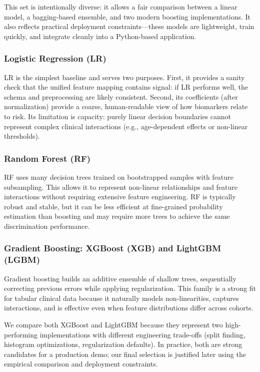 \documentclass[journal]{IEEEtran}
\begin{document}
This set is intentionally diverse: it allows a fair comparison between a linear model, a bagging-based ensemble, and two modern boosting implementations. It also reflects practical deployment constraints---these models are lightweight, train quickly, and integrate cleanly into a Python-based application.

\subsubsection{Logistic Regression (LR)}
LR is the simplest baseline and serves two purposes. First, it provides a sanity check that the unified feature mapping contains signal: if LR performs well, the schema and preprocessing are likely consistent. Second, its coefficients (after normalization) provide a coarse, human-readable view of how biomarkers relate to risk. Its limitation is capacity: purely linear decision boundaries cannot represent complex clinical interactions (e.g., age-dependent effects or non-linear thresholds).

\subsubsection{Random Forest (RF)}
RF uses many decision trees trained on bootstrapped samples with feature subsampling. This allows it to represent non-linear relationships and feature interactions without requiring extensive feature engineering. RF is typically robust and stable, but it can be less efficient at fine-grained probability estimation than boosting and may require more trees to achieve the same discrimination performance.

\subsubsection{Gradient Boosting: XGBoost (XGB) and LightGBM (LGBM)}
Gradient boosting builds an additive ensemble of shallow trees, sequentially correcting previous errors while applying regularization. This family is a strong fit for tabular clinical data because it naturally models non-linearities, captures interactions, and is effective even when feature distributions differ across cohorts.

We compare both XGBoost and LightGBM because they represent two high-performing implementations with different engineering trade-offs (split finding, histogram optimizations, regularization defaults). In practice, both are strong candidates for a production demo; our final selection is justified later using the empirical comparison and deployment constraints.
\end{document}
